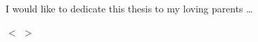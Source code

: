 
\begin{dedication} %

I would like to dedicate this thesis to my loving parents \ldots

\end{dedication}

$<$ $>$  



